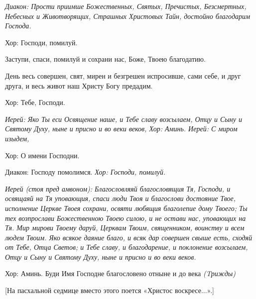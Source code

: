 

\itshape  Диакон:\normalfont{} Прости приимше Божественных, Святых, Пречистых, Безсмертных, Небесных и Животворящих, Страшных Христовых Тайн, достойно благодарим Господа. \itshape 


  Хор:\normalfont{} Господи, помилуй. 


  Заступи, спаси, помилуй и сохрани нас, Боже, Твоею благодатию. 


  День весь совершен, свят, мирен и безгрешен испросивше, сами себе, и друг друга, и весь живот наш Христу Богу предадим. \itshape 


  Хор:\normalfont{} Тебе, Господи. 


\itshape Иерей:\normalfont{} Яко Ты еси Освящение наше, и Тебе славу возсылаем, Отцу и Сыну и Святому Духу, ныне и присно и во веки веков, \itshape  Хор:\normalfont{} Аминь. \itshape  Иерей: С\normalfont{} миром изыдем, \itshape 


  Хор:\normalfont{} О имени Господни. \itshape 


  Диакон:\normalfont{} Господу помолимся. \itshape  Хор:\normalfont{} Господи, помилуй. 




\itshape   Иерей (стоя пред амвоном):\normalfont{} Благословляяй благословящия Тя, Господи, и освящаяй на Тя уповающия, спаси люди Твоя и благослови достояние Твое, исполнение Церкве Твоея сохрани, освяти любящия благолепие дому Твоего; Ты тех возпрослави Божественною Твоею силою, и не остави нас, уповающих на Тя. Мир мирови Твоему даруй, Церквам Твоим, священником, воинству и всем людем Твоим. Яко всякое даяние благо, и всяк дар совершен свыше есть, сходяй от Тебе, Отца Светов; и Тебе славу, и благодарение, и поклонение возсылаем, Отцу и Сыну и Святому Духу, ныне и присно и во веки веков. \itshape 


  Хор:\normalfont{} Аминь. Буди Имя Господне благословено отныне и до века \itshape (Tрижд\normalfont{}ы)


  [На пасхальной седмице вместо этого поется «Христос воскресе...».]




